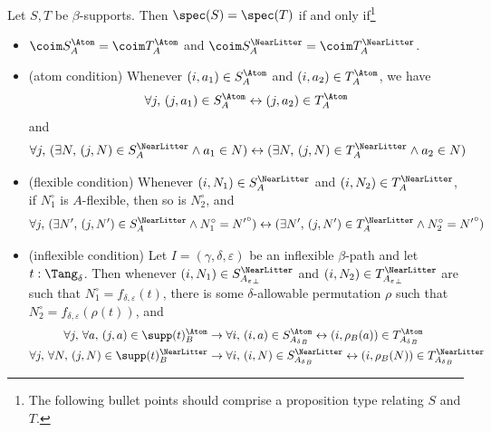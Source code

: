 \begin{proposition}
  \label{prop:spec_eq_spec_iff}
  Let \( S, T \) be \( \beta \)-supports.
  Then \( \spec(S) = \spec(T) \) if and only if\footnote{The following bullet points should comprise a proposition type relating \( S \) and \( T \).}
  \begin{itemize}
    \item \( \coim S_A^\Atom = \coim T_A^\Atom \) and \( \coim S_A^\NearLitter = \coim T_A^\NearLitter \).
    \item (atom condition) Whenever \( (i, a_1) \in S_A^\Atom \) and \( (i, a_2) \in T_A^\Atom \), we have
    \[ \forall j,\, (j, a_1) \in S_A^\Atom \leftrightarrow (j, a_2) \in T_A^\Atom \]
    and
    \[ \forall j,\, (\exists N,\, (j, N) \in S_A^\NearLitter \wedge a_1 \in N) \leftrightarrow (\exists N,\, (j, N) \in T_A^\NearLitter \wedge a_2 \in N) \]
    \item (flexible condition) Whenever \( (i, N_1) \in S_A^\NearLitter \) and \( (i, N_2) \in T_A^\NearLitter \), if \( N_1^\circ \) is \( A \)-flexible, then so is \( N_2^\circ \), and
    \[ \forall j,\, (\exists N',\, (j, N') \in S_A^\NearLitter \wedge N_1^\circ = {N'}^\circ) \leftrightarrow (\exists N',\, (j, N') \in T_A^\NearLitter \wedge N_2^\circ = {N'}^\circ) \]
    \item (inflexible condition) Let \( I = (\gamma,\delta,\varepsilon) \) be an inflexible \( \beta \)-path and let \( t : \Tang_\delta \).
    Then whenever \( (i, N_1) \in S_{{A_\varepsilon}_\bot}^\NearLitter \) and \( (i, N_2) \in T_{{A_\varepsilon}_\bot}^\NearLitter \) are such that \( N_1^\circ = f_{\delta,\varepsilon}(t) \), there is some \( \delta \)-allowable permutation \( \rho \) such that \( N_2^\circ = f_{\delta,\varepsilon}(\rho(t)) \), and
    \begin{align*}
      \forall j,\, \forall a,\, (j, a) \in \supp(t)_B^\Atom &\to \forall i,\, (i, a) \in S_{{A_\delta}_B}^\Atom \leftrightarrow (i, \rho_B(a)) \in T_{{A_\delta}_B}^\Atom \\
      \forall j,\, \forall N,\, (j, N) \in \supp(t)_B^\NearLitter &\to \forall i,\, (i, N) \in S_{{A_\delta}_B}^\NearLitter \leftrightarrow (i, \rho_B(N)) \in T_{{A_\delta}_B}^\NearLitter
    \end{align*}
  \end{itemize}
\end{proposition}
